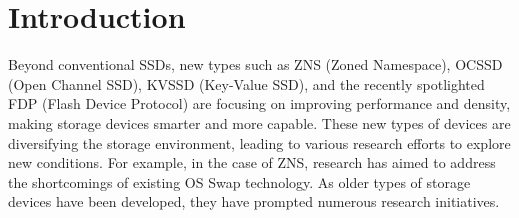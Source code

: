 \section{Introduction} %
\label{s:intro}





Beyond conventional SSDs, new types such as ZNS (Zoned Namespace), OCSSD (Open Channel SSD), KVSSD (Key-Value SSD), and the recently spotlighted FDP (Flash Device Protocol) are focusing on improving performance and density, making storage devices smarter and more capable. 
These new types of devices are diversifying the storage environment, leading to various research efforts to explore new conditions.
For example, in the case of ZNS, research has aimed to address the shortcomings of existing OS Swap technology. 
As older types of storage devices have been developed, they have prompted numerous research initiatives.

